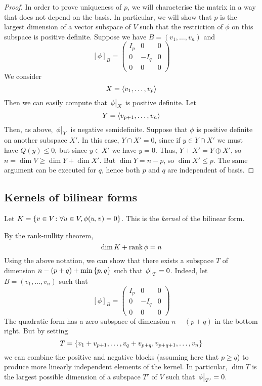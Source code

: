 \begin{proof}
	In order to prove uniqueness of \( p \), we will characterise the matrix in a way that does not depend on the basis.
	In particular, we will show that \( p \) is the largest dimension of a vector subspace of \( V \) such that the restriction of \( \phi \) on this subspace is positive definite.
	Suppose we have \( B = (v_1, \dots, v_n) \) and
	\[
		[\phi]_B = \begin{pmatrix}
			I_p & 0    & 0 \\
			0   & -I_q & 0 \\
			0   & 0    & 0
		\end{pmatrix}
	\]
	We consider
	\[
		X = \langle{} v_1, \dots, v_p \rangle
	\]
	Then we can easily compute that \( \eval{\phi}_X \) is positive definite.
	Let
	\[
		Y = \langle{} v_{p+1}, \dots, v_n \rangle
	\]
	Then, as above, \( \eval{\phi}_Y \) is negative semidefinite.
	Suppose that \( \phi \) is positive definite on another subspace \( X' \).
	In this case, \( Y \cap X' = \qty{0} \), since if \( y \in Y \cap X' \) we must have \( Q(y) \leq 0 \), but since \( y \in X' \) we have \( y = 0 \).
	Thus, \( Y + X' = Y \oplus X' \), so \( n = \dim V \geq \dim Y + \dim X' \).
	But \( \dim Y = n - p \), so \( \dim X' \leq p \).
	The same argument can be executed for \( q \), hence both \( p \) and \( q \) are independent of basis.
\end{proof}

\subsection{Kernels of bilinear forms}
\begin{definition}
	Let \( K = \qty{ v \in V \colon \forall u \in V, \phi(u,v) = 0 } \).
	This is the \textit{kernel} of the bilinear form.
\end{definition}
\begin{remark}
	By the rank-nullity theorem,
	\[
		\dim K + \rank \phi = n
	\]
	Using the above notation, we can show that there exists a subspace \( T \) of dimension \( n - (p+q) + \min\qty{p,q} \) such that \( \eval{\phi}_T = 0 \).
	Indeed, let \( B = (v_1, \dots, v_n) \) such that
	\[
		[\phi]_B = \begin{pmatrix}
			I_p & 0    & 0 \\
			0   & -I_q & 0 \\
			0   & 0    & 0
		\end{pmatrix}
	\]
	The quadratic form has a zero subspace of dimension \( n - (p+q) \) in the bottom right.
	But by setting
	\[
		T = \qty{v_1 + v_{p+1}, \dots, v_q + v_{p+q}, v_{p+q+1}, \dots, v_n}
	\]
	we can combine the positive and negative blocks (assuming here that \( p \geq q \)) to produce more linearly independent elements of the kernel.
	In particular, \( \dim T \) is the largest possible dimension of a subspace \( T' \) of \( V \) such that \( \eval{\phi}_{T'} = 0 \).
\end{remark}

